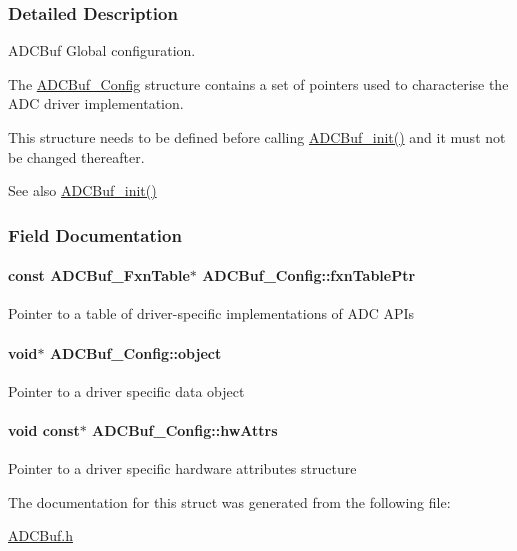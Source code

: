 \subsubsection{Detailed Description}
A\+D\+C\+Buf Global configuration. 

The \hyperlink{struct_a_d_c_buf___config}{A\+D\+C\+Buf\+\_\+\+Config} structure contains a set of pointers used to characterise the A\+D\+C driver implementation.

This structure needs to be defined before calling \hyperlink{_a_d_c_buf_8h_a88a0ab421304465b22417a7adef6c0c2}{A\+D\+C\+Buf\+\_\+init()} and it must not be changed thereafter.

\begin{DoxySeeAlso}{See also}
\hyperlink{_a_d_c_buf_8h_a88a0ab421304465b22417a7adef6c0c2}{A\+D\+C\+Buf\+\_\+init()} 
\end{DoxySeeAlso}


\subsubsection{Field Documentation}
\paragraph[{fxn\+Table\+Ptr}]{\setlength{\rightskip}{0pt plus 5cm}const {\bf A\+D\+C\+Buf\+\_\+\+Fxn\+Table}$\ast$ A\+D\+C\+Buf\+\_\+\+Config\+::fxn\+Table\+Ptr}\label{struct_a_d_c_buf___config_a473ad7e4d4c1d2ad9c4e96768447f6c7}
Pointer to a table of driver-\/specific implementations of A\+D\+C A\+P\+Is 
\paragraph[{object}]{\setlength{\rightskip}{0pt plus 5cm}void$\ast$ A\+D\+C\+Buf\+\_\+\+Config\+::object}\label{struct_a_d_c_buf___config_a07b5e2c4dd87d3356c825f51aacb496a}
Pointer to a driver specific data object 
\paragraph[{hw\+Attrs}]{\setlength{\rightskip}{0pt plus 5cm}void const$\ast$ A\+D\+C\+Buf\+\_\+\+Config\+::hw\+Attrs}\label{struct_a_d_c_buf___config_addb6e02b3b790b7123af2d7b7d1a1cf1}
Pointer to a driver specific hardware attributes structure 

The documentation for this struct was generated from the following file\+:\begin{DoxyCompactItemize}
\item 
\hyperlink{_a_d_c_buf_8h}{A\+D\+C\+Buf.\+h}\end{DoxyCompactItemize}
